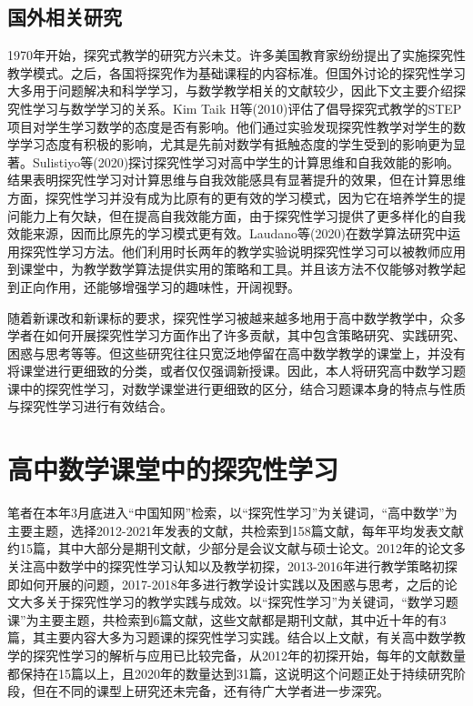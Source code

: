 \subsection{国外相关研究}

1970年开始，探究式教学的研究方兴未艾。许多美国教育家纷纷提出了实施探究性教学模式。之后，各国将探究作为基础课程的内容标准。但国外讨论的探究性学习大多用于问题解决和科学学习，与数学教学相关的文献较少，因此下文主要介绍探究性学习与数学学习的关系。Kim Taik H等(2010)评估了倡导探究式教学的STEP项目对学生学习数学的态度是否有影响\cite{kim2010impact}。他们通过实验发现探究性教学对学生的数学学习态度有积极的影响，尤其是先前对数学有抵触态度的学生受到的影响更为显著。Sulistiyo等(2020)探讨探究性学习对高中学生的计算思维和自我效能的影响\cite{sulistiyo2020effectiveness}。结果表明探究性学习对计算思维与自我效能感具有显著提升的效果，但在计算思维方面，探究性学习并没有成为比原有的更有效的学习模式，因为它在培养学生的提问能力上有欠缺，但在提高自我效能方面，由于探究性学习提供了更多样化的自我效能来源，因而比原先的学习模式更有效。Laudano等(2020)在数学算法研究中运用探究性学习方法。他们利用时长两年的教学实验说明探究性学习可以被教师应用到课堂中，为教学数学算法提供实用的策略和工具。并且该方法不仅能够对教学起到正向作用，还能够增强学习的趣味性，开阔视野\cite{laudano2020experience}。

随着新课改和新课标的要求，探究性学习被越来越多地用于高中数学教学中，众多学者在如何开展探究性学习方面作出了许多贡献，其中包含策略研究、实践研究、困惑与思考等等。但这些研究往往只宽泛地停留在高中数学教学的课堂上，并没有将课堂进行更细致的分类，或者仅仅强调新授课。因此，本人将研究高中数学习题课中的探究性学习，对数学课堂进行更细致的区分，结合习题课本身的特点与性质与探究性学习进行有效结合。



\section{高中数学课堂中的探究性学习}

笔者在本年3月底进入“中国知网”检索，以“探究性学习”为关键词，“高中数学”为主要主题，选择2012-2021年发表的文献，共检索到158篇文献，每年平均发表文献约15篇，其中大部分是期刊文献，少部分是会议文献与硕士论文。2012年的论文多关注高中数学中的探究性学习认知以及教学初探，2013-2016年进行教学策略初探即如何开展的问题，2017-2018年多进行教学设计实践以及困惑与思考，之后的论文大多关于探究性学习的教学实践与成效。以“探究性学习”为关键词，“数学习题课”为主要主题，共检索到6篇文献，这些文献都是期刊文献，其中近十年的有3篇，其主要内容大多为习题课的探究性学习实践。结合以上文献，有关高中数学教学的探究性学习的解析与应用已比较完备，从2012年的初探开始，每年的文献数量都保持在15篇以上，且2020年的数量达到31篇，这说明这个问题正处于持续研究阶段，但在不同的课型上研究还未完备，还有待广大学者进一步深究。